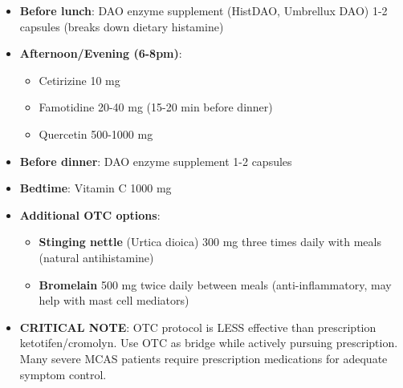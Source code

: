 \begin{enumerate}
\begin{itemize}
\begin{itemize}
\begin{itemize}
                \item \textbf{Safety margin}: Upper tolerable limit (UL) is 2000 mg/day. Our recommended dose of 2000 mg/day is at the UL but well-tolerated in most individuals.
                \item \textbf{Side effects}: Doses $>$1000 mg may cause loose stools or diarrhea in some individuals (reduce dose if occurs). Kidney stone risk is minimal at 2000 mg/day in individuals without history of oxalate stones.
                \item \textbf{Monitoring}: None required for most patients. If history of kidney stones, consider 24-hour urine oxalate monitoring.
            \end{itemize}
        \end{itemize}
        \item \textbf{Before lunch}: DAO enzyme supplement (HistDAO, Umbrellux DAO) 1-2 capsules (breaks down dietary histamine)
        \item \textbf{Afternoon/Evening (6-8pm)}:
        \begin{itemize}
            \item Cetirizine 10 mg
            \item Famotidine 20-40 mg (15-20 min before dinner)
            \item Quercetin 500-1000 mg
        \end{itemize}
        \item \textbf{Before dinner}: DAO enzyme supplement 1-2 capsules
        \item \textbf{Bedtime}: Vitamin C 1000 mg
        \item \textbf{Additional OTC options}:
        \begin{itemize}
            \item \textbf{Stinging nettle} (Urtica dioica) 300 mg three times daily with meals (natural antihistamine)
            \item \textbf{Bromelain} 500 mg twice daily between meals (anti-inflammatory, may help with mast cell mediators)
        \end{itemize}
        \item \textbf{CRITICAL NOTE}: OTC protocol is LESS effective than prescription ketotifen/cromolyn. Use OTC as bridge while actively pursuing prescription. Many severe MCAS patients require prescription medications for adequate symptom control.
    \end{itemize}
\end{enumerate}

